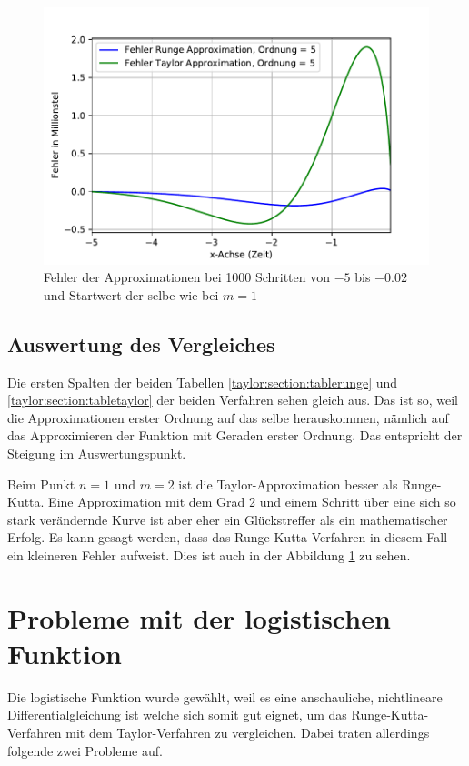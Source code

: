 \begin{figure}
	\centering
	\includegraphics[width=12cm]{papers/taylor/taylorPictures/FehlerRungeUndTaylor.pdf}
	\caption{Fehler der Approximationen bei 1000 Schritten von $-5$ bis $-0.02$ und Startwert der selbe wie bei $m=1$}
	\label{taylor:section:fig:FehlerRungeTaylor}
\end{figure}

\subsection{Auswertung des Vergleiches}
\label{taylor:subsection:Auswertung}
Die ersten Spalten der beiden Tabellen \ref{taylor:section:tablerunge} und \ref{taylor:section:tabletaylor} der beiden Verfahren sehen gleich aus.
Das ist so, weil die Approximationen erster Ordnung auf das selbe herauskommen, nämlich auf das Approximieren der Funktion mit Geraden erster Ordnung.
Das entspricht der Steigung im Auswertungspunkt.

Beim Punkt $n=1$ und $m=2$ ist die Taylor-Approximation besser als Runge-Kutta.
Eine Approximation mit dem Grad 2 und einem Schritt über eine sich so stark verändernde Kurve ist aber eher ein Glückstreffer als ein mathematischer Erfolg.
Es kann gesagt werden, dass das Runge-Kutta-Verfahren in diesem Fall ein kleineren Fehler aufweist. Dies ist auch in der Abbildung \ref{taylor:section:fig:FehlerRungeTaylor} zu sehen.

\section{Probleme mit der logistischen Funktion}
\label{taylor:subsection:Probleme}
Die logistische Funktion wurde gewählt, weil es eine anschauliche, nichtlineare Differentialgleichung ist welche sich somit gut eignet, um das Runge-Kutta-Verfahren mit dem Taylor-Verfahren zu vergleichen.
Dabei traten allerdings folgende zwei Probleme auf.

